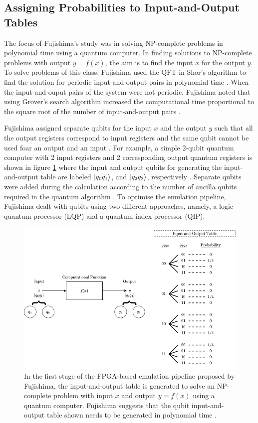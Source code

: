 \subsection{Assigning Probabilities to Input-and-Output Tables}

The focus of Fujishima's study was in solving \gls{NP-complete} problems in polynomial time using a quantum computer. In finding solutions to NP-complete problems with output $y = f(x)$, the aim is to find the input $x$ for the output $y$. To solve problems of this class, Fujishima used the QFT in Shor's algorithm to find the solution for periodic input-and-output pairs in polynomial time \cite{fujishima2003fpga}. When the input-and-ouput pairs of the system were not periodic, Fujishima noted that using Grover's search algorithm increased the computational time proportional to the square root of the number of input-and-output pairs \cite{fujishima2003fpga}. 

Fujishima assigned separate qubits for the input $x$ and the output $y$ such that all the output registers correspond to input registers and the same qubit cannot be used foar an output and an input \cite{fujishima2003fpga}. For example, a simple 2-qubit quantum computer with 2 input registers and 2 corresponding output quantum registers is shown in figure \ref{fig:fujishima-inout} where the input and output qubits for generating the input-and-output table are labeled $\ket{q_0q_1}$, and $\ket{q_2q_3}$, respectively \cite{fujishima2003fpga}. Separate qubits were added during the calculation according to the number of ancilla qubits required in the quantum algorithm \cite{fujishima2003fpga}. To optimise the emulation pipeline, Fujishima dealt with qubits using two different approaches, namely, a logic quantum processor (LQP) and a quantum index processor (QIP). 

\begin{figure}[!ht]
	\centering
	\includegraphics[width=1.0\linewidth]{body/ch3/figs/fujishima-inout}
	\caption[Input-and-Output Table by Fujishima.]{In the first stage of the FPGA-based emulation pipeline proposed by Fujishima, the input-and-output table is generated to solve an NP-complete problem with input $x$ and output $y=f(x)$ using a quantum computer. Fujishima suggests that the qubit input-and-output table shown needs to be generated in polynomial time \cite{fujishima2003fpga}.}
	\label{fig:fujishima-inout}
\end{figure}

